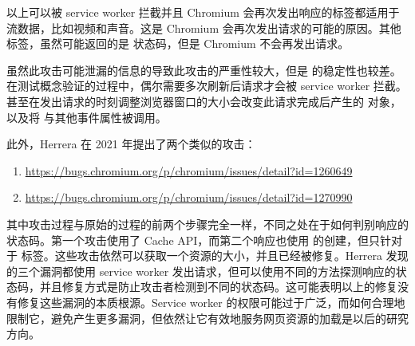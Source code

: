 以上可以被 service worker 拦截并且 Chromium 会再次发出响应的标签都适用于流数据，比如视频和声音。这是 Chromium 会再次发出请求的可能的原因。其他标签，虽然可能返回的是  状态码，但是 Chromium 不会再发出请求。

虽然此攻击可能泄漏的信息的导致此攻击的严重性较大，但是 的稳定性也较差。在测试概念验证的过程中，偶尔需要多次刷新后请求才会被 service worker 拦截。甚至在发出请求的时刻调整浏览器窗口的大小会改变此请求完成后产生的  对象，以及将  与其他事件属性被调用。

此外，Herrera 在 2021 年提出了两个类似的攻击：

\begin{enumerate}
    \item \url{https://bugs.chromium.org/p/chromium/issues/detail?id=1260649}
    \item \url{https://bugs.chromium.org/p/chromium/issues/detail?id=1270990}
\end{enumerate}
    
其中攻击过程与原始的过程的前两个步骤完全一样，不同之处在于如何判别响应的状态码。第一个攻击使用了 Cache API，而第二个响应也使用  的创建，但只针对于  标签。这些攻击依然可以获取一个资源的大小，并且已经被修复。Herrera 发现的三个漏洞都使用 service worker 发出请求，但可以使用不同的方法探测响应的状态码，并且修复方式是防止攻击者检测到不同的状态码。这可能表明以上的修复没有修复这些漏洞的本质根源。Service worker 的权限可能过于广泛，而如何合理地限制它，避免产生更多漏洞，但依然让它有效地服务网页资源的加载是以后的研究方向。